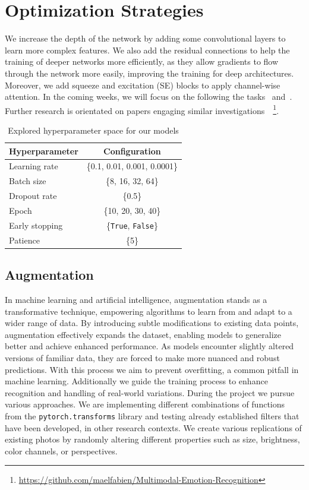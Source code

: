 \section{Optimization Strategies}
\label{sec:optim}
We increase the depth of the network by adding some convolutional layers to learn more complex features. 
We also add the residual connections to help the training of deeper networks more efficiently, 
as they allow gradients to flow through the network more easily, improving the training for deep architectures. 
Moreover, 
we add squeeze and excitation (SE) blocks to apply channel-wise attention. 
In the coming weeks, 
we will focus on the following the tasks~ and~.
Further research is orientated on papers engaging similar investigations~\cite{ZeilerF14,li_reliable_2017,VermaMRMV23}~\footnote{\url{https://github.com/maelfabien/Multimodal-Emotion-Recognition}}. 

\begin{table}
  \centering
  \begin{tabular}{@{}lc@{}}
    \toprule
    Hyperparameter & Configuration \\
    \midrule
    Learning rate & \{0.1, 0.01, 0.001, 0.0001\}  \\
    Batch size & \{8, 16, 32, 64\} \\
    Dropout rate & \{0.5\} \\
    Epoch & \{10, 20, 30, 40\} \\
    Early stopping & \{\texttt{True}, \texttt{False}\} \\
    Patience & \{5\} \\
    \bottomrule
  \end{tabular}
  \caption{Explored hyperparameter space for our models}
  \label{tab:hyper}
\end{table}

\subsection{Augmentation}
\label{sec:optim:aug}
In machine learning and artificial intelligence, 
augmentation stands as a transformative technique, 
empowering algorithms to learn from and adapt to a wider range of data. 
By introducing subtle modifications to existing data points, 
augmentation effectively expands the dataset, 
enabling models to generalize better and achieve enhanced performance.
As models encounter slightly altered versions of familiar data, 
they are forced to make more nuanced and robust predictions. 
With this process we aim to prevent overfitting, 
a common pitfall in machine learning. 
Additionally we guide the training process to enhance recognition and handling of real-world variations.
During the project we pursue various approaches. 
We are implementing different combinations of functions from the \texttt{pytorch.transforms} library and testing already established filters that have been developed, in other research contexts. 
We create various replications of existing photos by randomly altering different properties such as size, brightness, color channels, or perspectives.


